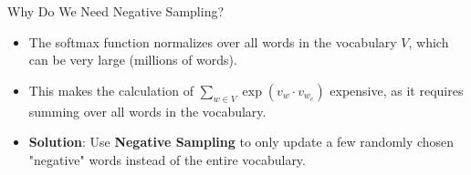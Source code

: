 \documentclass[serif, aspectratio=169]{beamer}
\begin{document}








\begin{frame}{Why Do We Need Negative Sampling?}
    \begin{itemize}
        \item The softmax function normalizes over all words in the vocabulary \(V\), which can be very large (millions of words).
        \item This makes the calculation of \(\sum_{w \in V} \exp(v_w \cdot v_{w_c})\) expensive, as it requires summing over all words in the vocabulary.
        \item \textbf{Solution}: Use \textbf{Negative Sampling} to only update a few randomly chosen "negative" words instead of the entire vocabulary.
    \end{itemize}
\end{frame}
\end{document}
